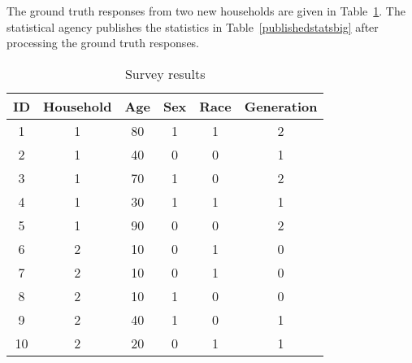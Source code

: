 \documentclass[5p,times,11pt]{elsarticle}
\begin{document}
The ground truth responses from two new households are given in Table~\ref{resultsbig}. The statistical agency publishes the statistics in Table~\ref{publishedstatsbig} after processing the ground truth responses.
\begin{table}[t]
\begin{tabular}{c|c|c|c|c|c}
ID & Household & Age & Sex & Race & Generation \\
\hline
1 & 1 & 80 & 1 & 1 & 2  \\
2 & 1 & 40 & 0 & 0 & 1  \\
3 & 1 & 70 & 1 & 0 & 2  \\
4 & 1 & 30 & 1 & 1 & 1  \\
5 & 1 & 90 & 0 & 0 & 2  \\
6 & 2 & 10 & 0 & 1 & 0  \\
7 & 2 & 10 & 0 & 1 & 0  \\
8 & 2 & 10 & 1 & 0 & 0  \\
9 & 2 & 40 & 1 & 0 & 1 \\
10 & 2 & 20 & 0 & 1 & 1 \\
\hline
\end{tabular}
\caption{Survey results}\label{resultsbig}
\end{table}
\end{document}
